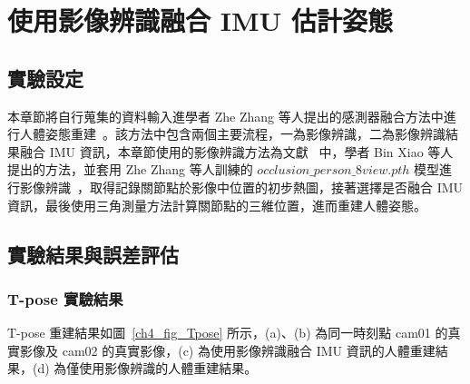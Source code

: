 \section{使用影像辨識融合 IMU 估計姿態}
\subsection{實驗設定}
本章節將自行蒐集的資料輸入進學者 Zhe Zhang 等人提出的感測器融合方法中進行人體姿態重建~\cite{Zhang_2020_CVPR}。該方法中包含兩個主要流程，一為影像辨識，二為影像辨識結果融合 IMU 資訊，本章節使用的影像辨識方法為文獻~\cite{Xiao_2018_ECCV} 中，學者 Bin Xiao 等人提出的方法，並套用 Zhe Zhang 等人訓練的 $occlusion\_person\_8view.pth$ 模型進行影像辨識~\cite{zhang2020adafuse}，取得記錄關節點於影像中位置的初步熱圖，接著選擇是否融合 IMU 資訊，最後使用三角測量方法計算關節點的三維位置，進而重建人體姿態。


\subsection{實驗結果與誤差評估}
\subsubsection*{T-pose 實驗結果}
T-pose 重建結果如圖~\ref{ch4_fig_Tpose} 所示，(a)、(b) 為同一時刻點 cam01 的真實影像及 cam02 的真實影像，(c) 為使用影像辨識融合 IMU 資訊的人體重建結果，(d) 為僅使用影像辨識的人體重建結果。

